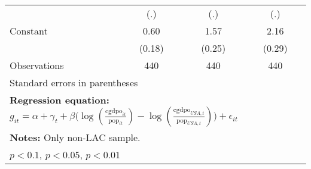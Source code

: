 \begin{table}[htbp]
\begin{tabular}{l*{3}{c}}
                &      (.)         &      (.)         &      (.)         \\
\addlinespace
Constant        &     0.60\sym{***}&     1.57\sym{***}&     2.16\sym{***}\\
                &   (0.18)         &   (0.25)         &   (0.29)         \\
\midrule
Observations    &      440         &      440         &      440         \\
\bottomrule
\multicolumn{4}{l}{\footnotesize Standard errors in parentheses}\\
\multicolumn{4}{l}{\footnotesize \textbf{Regression equation:} \(g_{it} = \alpha + \gamma_t + \beta \big(\log (\frac{\textrm{cgdpo}_{it}}{\textrm{pop}_{it}} ) - \log (\frac{\textrm{cgdpo}_{USA,t}}{\textrm{pop}_{USA,t}}  ) \big) + \epsilon_{it}\)}\\
\multicolumn{4}{l}{\footnotesize \textbf{Notes:} Only non-LAC sample.}\\
\multicolumn{4}{l}{\footnotesize \sym{*} \(p<0.1\), \sym{**} \(p<0.05\), \sym{***} \(p<0.01\)}\\
\end{tabular}
\end{table}
